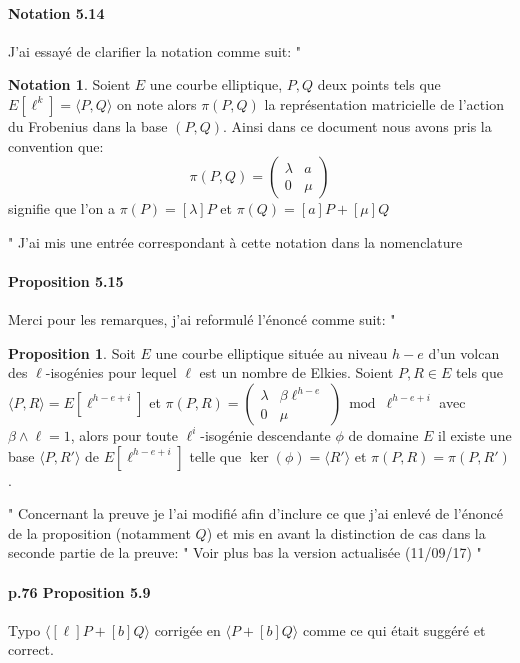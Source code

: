 \documentclass[10pt,a4paper]{article}
\theoremstyle{plain}
\theoremstyle{definition}
\theoremstyle{definition}
\theoremstyle{definition}
\theoremstyle{definition}
\newtheorem{prop}[thm]{Proposition}
\theoremstyle{definition}
\theoremstyle{remark}
\theoremstyle{remark}
\theoremstyle{definition}
\newtheorem{nota}[thm]{Notation}
\begin{document}
\paragraph{Notation 5.14}{J'ai essayé de clarifier la notation comme suit: "
\begin{nota} 
Soient $E$ une courbe elliptique, $P,Q$ deux points tels que $E[\ell^k]=\langle
P,Q \rangle$ on note alors $\pi(P,Q)$ la représentation matricielle de l'action
du Frobenius dans la base $(P,Q)$. Ainsi dans ce document nous avons pris la 
convention que:
\[
\pi(P,Q)=\left(
\begin{matrix}
\lambda & a \\
0 & \mu
\end{matrix}
 \right)
\]
signifie que l'on a $\pi(P)=[\lambda]P$ et $\pi(Q)=[a]P+[\mu]Q$
\end{nota}" J'ai mis une entrée correspondant à cette notation dans la 
nomenclature}

\paragraph{Proposition 5.15}{Merci pour les remarques, j'ai reformulé l'énoncé 
comme suit: "
\begin{prop}
\label{pro:etu:atk:elk}
Soit $E$ une courbe elliptique située au niveau $h-e$ d'un volcan des 
$\ell$-isogénies pour lequel $\ell$ est un nombre de Elkies. Soient $P,R 
\in E$ tels que $\langle P,R \rangle =E[\ell^{h-e+i}]$ et $\pi(P,R)= 
\left( \begin{matrix}\lambda & \beta 
\ell^{h-e} \\0 & \mu \end{matrix}\right) \bmod \ell^{h-e+i}$ avec $\beta \wedge
\ell=1$, alors pour toute $\ell^i$-isogénie descendante $\phi$ de domaine $E$ il
existe une base $\langle P,R' \rangle$ de $E[\ell^{h-e+i}]$ telle que  $\ker(\phi)=\langle R' \rangle$ et $\pi(P,R)=\pi(P,R')$.
\end{prop}"
Concernant la preuve je l'ai modifié afin d'inclure ce que j'ai enlevé de 
l'énoncé de la proposition (notamment $Q$) et mis en avant la distinction de 
cas dans la seconde partie de la preuve:
"
Voir plus bas la version actualisée (11/09/17)
"}

\paragraph{p.76 Proposition 5.9}{Typo $\langle [\ell] P+ [b]Q \rangle$ corrigée en $\langle P+ [b]Q \rangle$ comme ce qui était suggéré et correct.}
\end{document}
